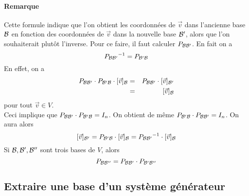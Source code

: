 \paragraph{Remarque} Cette formule indique que l'on obtient les coordonnées de $\vec{v}$ dans l'ancienne base $\mathcal{B}$ en fonction des coordonnées de $\vec{v}$ dans la nouvelle base $\mathcal{B}'$, alors que l'on souhaiterait plutôt l'inverse. Pour ce faire, il faut calculer $P_{\mathcal{B} \mathcal{B}'}$. En fait on a
$${P_{\mathcal{B} \mathcal{B}'}}^{-1} = P_{\mathcal{B}' \mathcal{B}}$$
En effet, on a
\begin{eqnarray*}
  P_{\mathcal{B} \mathcal{B}'} \cdot P_{\mathcal{B}' \mathcal{B}} \cdot [\vec{v}]_{\mathcal{B}} &=& P_{\mathcal{B} \mathcal{B}'} \cdot [\vec{v}]_{\mathcal{B}'} \\
   &=& [\vec{v}]_{\mathcal{B}}
\end{eqnarray*}
pour tout $\vec{v} \in V$. \\
Ceci implique que $P_{\mathcal{B} \mathcal{B}'} \cdot P_{\mathcal{B}' \mathcal{B}} = I_n$. On obtient de même $P_{\mathcal{B}' \mathcal{B}} \cdot P_{\mathcal{B} \mathcal{B}'} = I_n$. On aura alors
$$[\vec{v}]_{\mathcal{B}'} = P_{\mathcal{B}' \mathcal{B}} \cdot [\vec{v}]_{\mathcal{B}} = {P_{\mathcal{B} \mathcal{B}'}}^{-1} \cdot [\vec{v}]_{\mathcal{B}}$$
Si $\mathcal{B}, \mathcal{B}', \mathcal{B}''$ sont trois bases de $V$, alors
$$P_{\mathcal{B} \mathcal{B}''} = P_{\mathcal{B} \mathcal{B}'} \cdot P_{\mathcal{B}' \mathcal{B}''}$$

%
\subsection{Extraire une base d'un système générateur}
%

